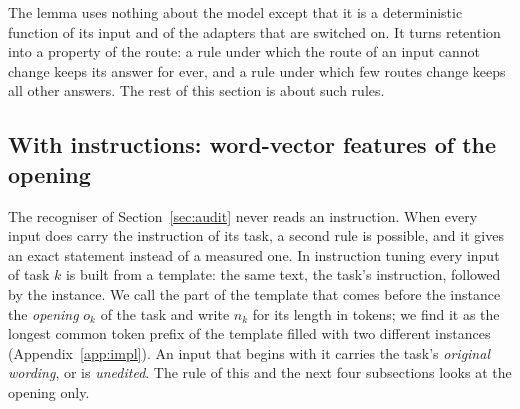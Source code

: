 The lemma uses nothing about the model except that it is a deterministic function of its input and
of the adapters that are switched on. It turns retention into a property of the route: a rule under
which the route of an input cannot change keeps its answer for ever, and a rule under which few
routes change keeps all other answers. The rest of this section is about such rules.





\subsection{With instructions: word-vector features of the opening}
\label{sec:features}

The recogniser of Section~\ref{sec:audit} never reads an instruction. When every input does carry
the instruction of its task, a second rule is possible, and it gives an exact statement instead of
a measured one. In instruction tuning every input of task $k$ is built
from a template: the same text, the task's instruction, followed by the instance. We call the part
of the template that comes before the instance the \emph{opening} $o_k$ of the task and write $n_k$
for its length in tokens; we find it as the longest common token prefix of the template filled with two
different instances (Appendix~\ref{app:impl}). An input that begins with it carries the task's
\emph{original wording}, or is \emph{unedited}. The rule of this and the next four subsections looks
at the opening only.

